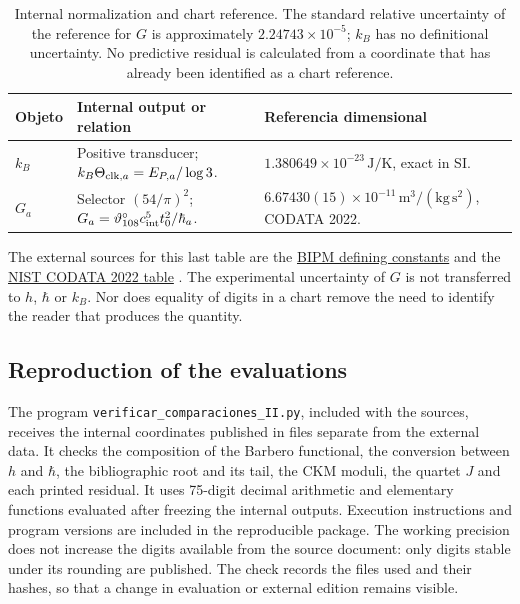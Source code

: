 \begin{table}[htbp]
\centering\small
\begin{tabularx}{\linewidth}{@{}lXX@{}}
\toprule
Objeto & Internal output or relation & Referencia dimensional\\
\midrule
\(k_B\) & Positive transducer; \(k_B\Theta_{{\rm clk},a}=E_{P,a}/\log3\).
& \(1.380649\times10^{-23}\,\mathrm{J/K}\), exact in SI.\\[4pt]
\(G_a\) & Selector \((54/\pi)^2\); \(G_a=\vartheta_{108}^{\circ}c_{\rm int}^5t_0^2/\hbar_a\).
& \(6.67430(15)\times10^{-11}\,\mathrm{m^3/(kg\,s^2)}\), CODATA 2022.\\
\bottomrule
\end{tabularx}
\caption{Internal normalization and chart reference. The standard relative
uncertainty of the reference for \(G\) is approximately
\(2.24743\times10^{-5}\); \(k_B\) has no definitional uncertainty.
No predictive residual is calculated from a coordinate that has already
been identified as a chart reference.}
\label{ii:tab:ii-kb-g-cartas}
\end{table}

The external sources for this last table are the
\href{https://www.bipm.org/en/measurement-units/si-defining-constants}
{BIPM defining constants} and the
\href{https://physics.nist.gov/cuu/Constants/Table/allascii.txt}
{NIST CODATA 2022 table} \cite{ii:codata2022}.
The experimental uncertainty of \(G\) is not transferred to \(h\),
\(\hbar\) or \(k_B\). Nor does equality of digits in a chart
remove the need to identify the reader that produces the quantity.

\subsection{Reproduction of the evaluations}

The program \texttt{verificar\_comparaciones\_II.py}, included with the
sources, receives the internal coordinates published in files separate
from the external data. It checks the composition of the Barbero functional,
the conversion between \(h\) and \(\hbar\), the bibliographic root and its tail,
the CKM moduli, the quartet \(J\) and each printed residual. It uses
75-digit decimal arithmetic and elementary functions evaluated after
freezing the internal outputs. Execution instructions
and program versions are included in the reproducible package.
The working precision does not increase the digits available from the
source document: only digits stable under its rounding are published.
The check records the files used and their hashes, so that
a change in evaluation or external edition remains visible.

